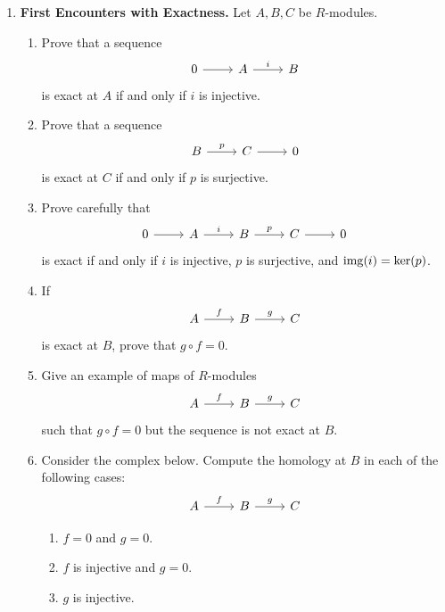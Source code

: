 \documentclass[12pt,reqno]{amsart}
\begin{document}
\begin{enumerate}[leftmargin=*, series=problems]

\item \textbf{First Encounters with Exactness.} Let $A,B,C$ be $R$-modules.
\begin{enumerate}
    \item Prove that a sequence
    \[
    \begin{tikzcd}
    0 \arrow[r] & A \arrow[r, "i"] & B
    \end{tikzcd}
    \]
    is exact at $A$ if and only if $i$ is injective.
    \item Prove that a sequence
    \[
    \begin{tikzcd}
    B \arrow[r, "p"] & C \arrow[r] & 0
    \end{tikzcd}
    \]
    is exact at $C$ if and only if $p$ is surjective.
    \item Prove carefully that
    \[
    \begin{tikzcd}
    0 \arrow[r] & A \arrow[r, "i"] & B \arrow[r, "p"] & C \arrow[r] & 0
    \end{tikzcd}
    \]
    is exact if and only if $i$ is injective, $p$ is surjective, and $\operatorname{img}(i)=\ker(p)$.
    \item If
    \[
    \begin{tikzcd}
    A \arrow[r, "f"] & B \arrow[r, "g"] & C
    \end{tikzcd}
    \]
    is exact at $B$, prove that $g\circ f=0$.
    \item Give an example of maps of $R$-modules
    \[
    \begin{tikzcd}
    A \arrow[r, "f"] & B \arrow[r, "g"] & C
    \end{tikzcd}
    \]
    such that $g\circ f=0$ but the sequence is not exact at $B$.
     \item Consider the complex below. Compute the homology at $B$ in each of the following cases:
\[
\begin{tikzcd}
A \arrow[r, "f"] & B \arrow[r, "g"] & C
\end{tikzcd}
\]
\begin{enumerate}
\item $f=0$ and $g=0$.
\item $f$ is injective and $g=0$.
\item $g$ is injective.
\end{enumerate}
\end{enumerate}


\end{enumerate}
\end{document}

